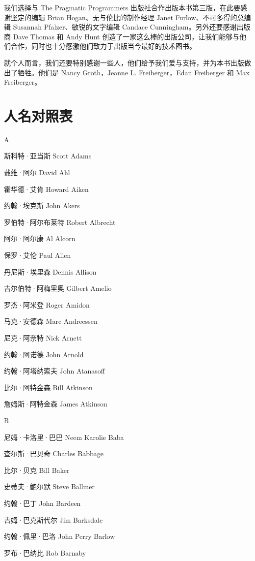 \documentclass[12pt,UTF8]{ctexbook}
\begin{document}
我们选择与 The Pragmatic Programmers 出版社合作出版本书第三版，在此要感谢坚定的编辑 Brian Hogan、无与伦比的制作经理 Janet Furlow、不可多得的总编辑 Susannah Pfalzer、敏锐的文字编辑 Candace Cunningham。另外还要感谢出版商 Dave Thomas 和 Andy Hunt 创造了一家这么棒的出版公司，让我们能够与他们合作，同时也十分感激他们致力于出版当今最好的技术图书。

就个人而言，我们还要特别感谢一些人，他们给予我们爱与支持，并为本书出版做出了牺牲。他们是 Nancy Groth，Jeanne L. Freiberger，Edan Freiberger 和 Max Freiberger。





\chapter{人名对照表}


A

斯科特·亚当斯 Scott Adams

戴维·阿尔 David Ahl

霍华德·艾肯 Howard Aiken

约翰·埃克斯 John Akers

罗伯特·阿尔布莱特 Robert Albrecht

阿尔·阿尔康 Al Alcorn

保罗·艾伦 Paul Allen

丹尼斯·埃里森 Dennis Allison

吉尔伯特·阿梅里奥 Gilbert Amelio

罗杰·阿米登 Roger Amidon

马克·安德森 Marc Andreessen

尼克·阿奈特 Nick Arnett

约翰·阿诺德 John Arnold

约翰·阿塔纳索夫 John Atanasoff

比尔·阿特金森 Bill Atkinson

詹姆斯·阿特金森 James Atkinson

B

尼姆·卡洛里·巴巴 Neem Karolie Baba

查尔斯·巴贝奇 Charles Babbage

比尔·贝克 Bill Baker

史蒂夫·鲍尔默 Steve Ballmer

约翰·巴丁 John Bardeen

吉姆·巴克斯代尔 Jim Barksdale

约翰·佩里·巴洛 John Perry Barlow

罗布·巴纳比 Rob Barnaby
\end{document}
